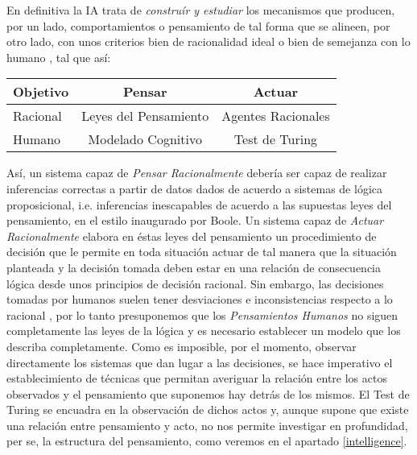 \documentclass[12pt]{memoir}
\begin{document}
En definitiva la IA trata de \textit{construír y estudiar} los mecanismos que producen, por un lado, comportamientos o pensamiento de tal forma que se alineen, por otro lado, con unos criterios bien de racionalidad ideal o bien de semejanza con lo humano \parencite[p.5]{modernAI}, tal que así:
\begin{center}
\begin{tabular}{l || c | c}
  Objetivo & Pensar & Actuar \\
 \hline
 \hline
 Racional & Leyes del Pensamiento & Agentes Racionales \\
 \hline
 Humano & Modelado Cognitivo & Test de Turing \\
 \hline
\end{tabular}
\end{center}

Así, un sistema capaz de \textit{Pensar Racionalmente} debería ser capaz de realizar inferencias correctas a partir de datos dados de acuerdo a sistemas de lógica proposicional, i.e. inferencias inescapables de acuerdo a las supuestas leyes del pensamiento, en el estilo inaugurado por Boole. Un sistema capaz de \textit{Actuar Racionalmente} elabora en éstas leyes del pensamiento un procedimiento de decisión que le permite en toda situación actuar de tal manera que la situación planteada y la decisión tomada deben estar en una relación de consecuencia lógica desde unos principios de decisión racional. Sin embargo, las decisiones tomadas por humanos suelen tener desviaciones e inconsistencias respecto a lo racional \parencite{framingKahnemanTversky}, por lo tanto presuponemos que los \textit{Pensamientos Humanos} no siguen completamente las leyes de la lógica y es necesario establecer un modelo que los describa completamente. Como es imposible, por el momento, observar directamente los sistemas que dan lugar a las decisiones, se hace imperativo el establecimiento de técnicas que permitan averiguar la relación entre los actos observados y el pensamiento que suponemos hay detrás de los mismos. El Test de Turing se encuadra en la observación de dichos actos y, aunque supone que existe una relación entre pensamiento y acto, no nos permite investigar en profundidad, per se, la estructura del pensamiento, como veremos en el apartado \ref{intelligence}.
\end{document}
